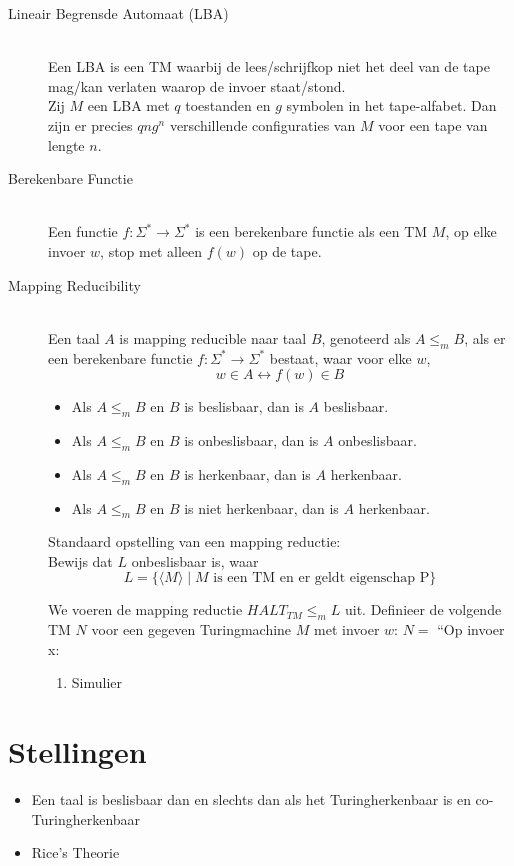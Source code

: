 \documentclass[]{article}
\begin{document}
\begin{itemize}
\begin{description}
	\item[Lineair Begrensde Automaat (LBA)] \hfill \\
	Een LBA is een TM waarbij de lees/schrijfkop niet het deel van de tape mag/kan verlaten waarop de invoer staat/stond.\\
	Zij $M$ een LBA met $q$ toestanden en $g$ symbolen in het tape-alfabet. Dan zijn er precies $qng^n$ verschillende configuraties van $M$ voor een tape van lengte $n$.
	
	\item[Berekenbare Functie] \hfill \\
	Een functie $f: \Sigma^* \rightarrow \Sigma^*$ is een berekenbare functie als een TM $M$, op elke invoer $w$, stop met alleen $f(w)$ op de tape.
	
	\item[Mapping Reducibility] \hfill \\
	Een taal $A$ is mapping reducible naar taal $B$, genoteerd als $A \leq_m B$, als er een berekenbare functie $f: \Sigma^* \rightarrow \Sigma^*$ bestaat, waar voor elke $w$,
	$$w \in A \longleftrightarrow f(w) \in B$$
	\begin{itemize}
		\item Als $A \leq_m B$ en $B$ is beslisbaar, dan is $A$ beslisbaar.
		\item Als $A \leq_m B$ en $B$ is onbeslisbaar, dan is $A$ onbeslisbaar.
		\item Als $A \leq_m B$ en $B$ is herkenbaar, dan is $A$ herkenbaar.
		\item Als $A \leq_m B$ en $B$ is niet herkenbaar, dan is $A$ herkenbaar.
	\end{itemize}
	
	Standaard opstelling van een mapping reductie:\\
	Bewijs dat $L$ onbeslisbaar is, waar
	$$L = \{ \langle M \rangle \mid M \mbox{ is een TM en er geldt eigenschap P}\}$$ 

	We voeren de mapping reductie $HALT_{TM} \leq_m L$ uit.
	Definieer de volgende TM $N$ voor een gegeven Turingmachine $M$ met invoer $w$:
	$N = $ ``Op invoer x:
	\begin{enumerate}
		\item Simulier
	\end{enumerate}
\end{description}
\end{itemize}

\section*{Stellingen}
\begin{itemize}
	\item Een taal is beslisbaar dan en slechts dan als het Turingherkenbaar is en co-Turingherkenbaar
	

	\item Rice's Theorie
	
\end{itemize}
\end{document}
